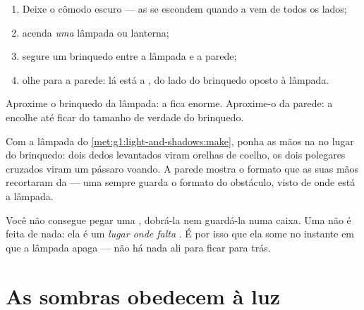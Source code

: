\begin{method}\label{met:g1:light-and-shadows:make}
\begin{enumerate}
  \item Deixe o cômodo escuro --- as  se escondem quando a 
        vem de todos os lados;
  \item acenda \emph{uma} lâmpada ou lanterna;
  \item segure um brinquedo entre a lâmpada e a parede;
  \item olhe para a parede: lá está a , do lado do brinquedo
        oposto à lâmpada.
\end{enumerate}
Aproxime o brinquedo da lâmpada: a  fica enorme. Aproxime-o da
parede: a  encolhe até ficar do tamanho de verdade do
brinquedo.
\end{method}

\begin{example}\label{ex:g1:light-and-shadows:animals}
Com a lâmpada do \cref{met:g1:light-and-shadows:make}, ponha as mãos
na  no lugar do brinquedo: dois dedos levantados viram orelhas de
coelho, os dois polegares cruzados viram um pássaro voando. A parede
mostra o formato que as suas mãos recortaram da  --- uma 
sempre guarda o formato do obstáculo, visto de onde está a lâmpada.
\end{example}

\begin{remark}\label{rem:g1:light-and-shadows:notathing}
Você não consegue pegar uma , dobrá-la nem guardá-la numa
caixa. Uma  não é feita de nada: ela é um \emph{lugar onde
falta }. É por isso que ela some no instante em que a lâmpada
apaga --- não há nada ali para ficar para trás.
\end{remark}

\section{As sombras obedecem à luz}

